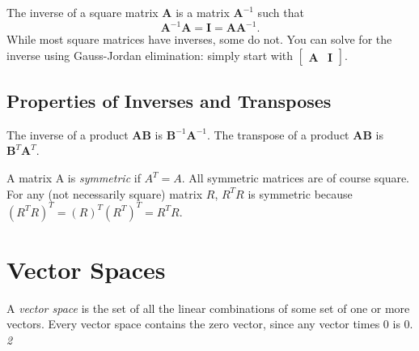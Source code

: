 \documentclass[10pt,letterpaper,twocolumn]{article}
\newcommand{\matr}[1]{\mathbf{#1}}
\begin{document}
The inverse of a square matrix $\matr{A}$ is a matrix $\matr{A}^{-1}$ such that 
$$
\matr{A}^{-1} \matr{A} = \matr{I} = \matr{A} \matr{A}^{-1}.
$$
While most square matrices have inverses, some do not. You can solve for the inverse using Gauss-Jordan elimination: simply start with 
$
\begin{bmatrix}
\matr{A} & \matr{I}
\end{bmatrix}
$.

\subsection{Properties of Inverses and Transposes}
The inverse of a product $\matr{A} \matr{B}$ is $\matr{B}^{-1} \matr{A}^{-1}$.
The transpose of a product $\matr{A} \matr{B}$ is $\matr{B}^{T} \matr{A}^{T}$.

A matrix A is \textit{symmetric} if $A^T = A$. All symmetric matrices are of course square. For any (not necessarily square) matrix $R$, $R^T R$ is symmetric because $(R^T R)^T = (R)^T (R^T)^T = R^T R$.


\section{Vector Spaces}
A \textit{vector space} is the set of all the linear combinations of some set of one or more vectors. Every vector space contains the zero vector, since any vector times $0$ is $0$. \textit{2}
\end{document}
